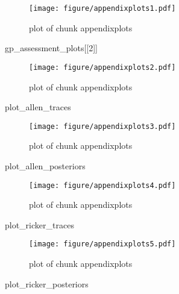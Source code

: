 \documentclass[author-year, review]{elsarticle} %
\makeatletter
\newenvironment{Shaded}{}{}
\newcommand{\DecValTok}[1]{\textcolor[rgb]{0.25,0.63,0.44}{{#1}}}
\newcommand{\NormalTok}[1]{{#1}}
\def\maxwidth{\ifdim\Gin@nat@width>\linewidth\linewidth
\else\Gin@nat@width\fi}
\let\Oldincludegraphics\includegraphics
\renewcommand{\includegraphics}[1]{\Oldincludegraphics[width=\maxwidth]{#1}}
\makeatother
\begin{document}
\begin{figure}[htbp]
\centering
\texttt{[image: figure/appendixplots1.pdf]}
\caption{plot of chunk appendixplots}
\end{figure}

\begin{Shaded}
\begin{Highlighting}[]
\NormalTok{gp_assessment_plots[[}\DecValTok{2}\NormalTok{]]}
\end{Highlighting}
\end{Shaded}

\begin{figure}[htbp]
\centering
\texttt{[image: figure/appendixplots2.pdf]}
\caption{plot of chunk appendixplots}
\end{figure}

\begin{Shaded}
\begin{Highlighting}[]
\NormalTok{plot_allen_traces}
\end{Highlighting}
\end{Shaded}

\begin{figure}[htbp]
\centering
\texttt{[image: figure/appendixplots3.pdf]}
\caption{plot of chunk appendixplots}
\end{figure}

\begin{Shaded}
\begin{Highlighting}[]
\NormalTok{plot_allen_posteriors}
\end{Highlighting}
\end{Shaded}

\begin{figure}[htbp]
\centering
\texttt{[image: figure/appendixplots4.pdf]}
\caption{plot of chunk appendixplots}
\end{figure}

\begin{Shaded}
\begin{Highlighting}[]
\NormalTok{plot_ricker_traces}
\end{Highlighting}
\end{Shaded}

\begin{figure}[htbp]
\centering
\texttt{[image: figure/appendixplots5.pdf]}
\caption{plot of chunk appendixplots}
\end{figure}

\begin{Shaded}
\begin{Highlighting}[]
\NormalTok{plot_ricker_posteriors}
\end{Highlighting}
\end{Shaded}
\end{document}
